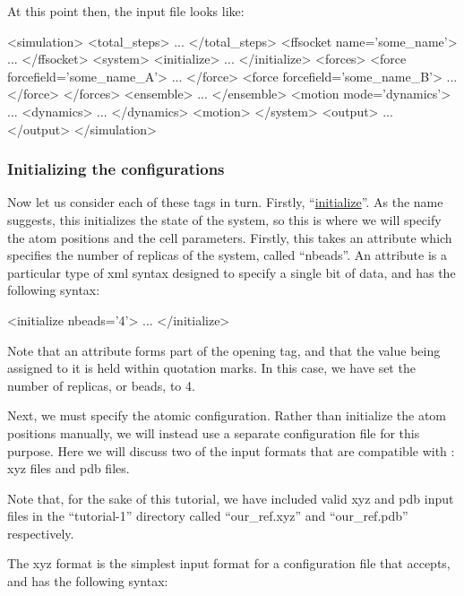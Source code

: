\documentclass[11pt,english,fleqn]{report}
\newenvironment{code}{%
\footnotesize 
\verbatim
}{
\endverbatim
\normalsize
}
\begin{document}
At this point then, the input file looks like:

\begin{code}
<simulation>
   <total_steps>
      ...
   </total_steps>
   <ffsocket name='some_name'>
      ...
   </ffsocket>
   <system>
      <initialize>
         ...
      </initialize>
      <forces>
         <force forcefield='some_name_A'>
            ...
         </force>
         <force forcefield='some_name_B'>
            ...
         </force>
      </forces>
      <ensemble>
         ...
      </ensemble>
      <motion mode='dynamics'>
         ...
         <dynamics>
            ...
         </dynamics>
      <motion>
   </system>
   <output>
      ...
   </output>
</simulation>
\end{code}

\subsubsection{Initializing the configurations}

Now let us consider each of these tags in turn. Firstly, 
{}``\hyperref[INITIALIZER]{initialize}''.
As the name suggests, this initializes the state of the system, so
this is where we will specify the atom positions and the cell
parameters. Firstly, this takes an attribute which specifies the number
of replicas of the system, called {}``nbeads''. An attribute is
a particular type of xml syntax designed to specify a single bit of
data, and has the following syntax:

\begin{code}
<initialize nbeads='4'>
   ...
</initialize>
\end{code}

Note that an attribute forms part of the opening tag, and that the
value being assigned to it is held within quotation marks. In this
case, we have set the number of replicas, or beads, to 4.

Next, we must specify the atomic configuration. Rather than initialize
the atom positions manually, we will instead use a separate configuration 
file for this purpose.
Here we will discuss two of the input formats that are compatible
with \ipi: xyz files and pdb files.

Note that, for the sake of this tutorial, we have 
included valid xyz and pdb input
files in the {}``tutorial-1'' directory called {}``our\_ref.xyz''
and {}``our\_ref.pdb'' respectively.

The xyz format is the simplest input format
for a configuration file that \ipi accepts, and has the following
syntax:
\end{document}
